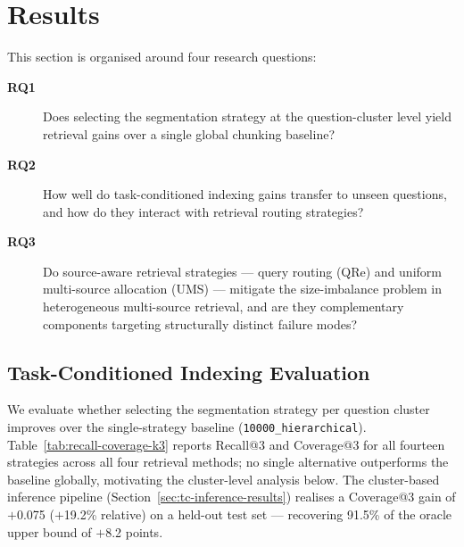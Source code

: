 %


\section{Results}
\label{sec:results}

This section is organised around four research questions:

\begin{description}
  \item[\textbf{RQ1}] Does selecting the segmentation strategy at the question-cluster
    level yield retrieval gains over a single global chunking baseline?
  \item[\textbf{RQ2}] How well do task-conditioned indexing gains transfer to unseen
    questions, and how do they interact with retrieval routing strategies?
  \item[\textbf{RQ3}] Do source-aware retrieval strategies — query routing (QRe) and
    uniform multi-source allocation (UMS) — mitigate the size-imbalance problem in
    heterogeneous multi-source retrieval, and are they complementary components
    targeting structurally distinct failure modes?
\end{description}

\subsection{Task-Conditioned Indexing Evaluation}
\label{sec:indexing-results}

We evaluate whether selecting the segmentation strategy per question cluster
improves over the single-strategy baseline (\texttt{10000\_hierarchical}).
Table~\ref{tab:recall-coverage-k3} reports Recall@3 and Coverage@3 for all
fourteen strategies across all four retrieval methods; no single alternative
outperforms the baseline globally, motivating the cluster-level analysis below.
The cluster-based inference pipeline (Section~\ref{sec:tc-inference-results})
realises a Coverage@3 gain of $+$0.075 ($+$19.2\% relative) on a
held-out test set --- recovering 91.5\% of the oracle upper bound of $+$8.2 points.

